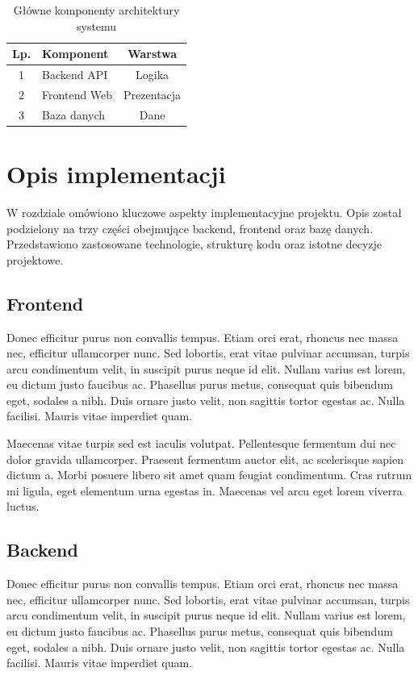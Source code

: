 \documentclass[times]{san}
\begin{document}
\begin{table}[h]
\centering
\caption{Główne komponenty architektury systemu}
\label{tab:lorem}
\begin{tabular}{|c|l|c|}
\hline
Lp. & Komponent          & Warstwa \\
\hline
1   & Backend API        & Logika   \\
2   & Frontend Web       & Prezentacja \\
3   & Baza danych        & Dane     \\
\hline
\end{tabular}
\end{table}

\section{Opis implementacji}

W rozdziale omówiono kluczowe aspekty implementacyjne projektu.
Opis został podzielony na trzy części obejmujące backend, frontend
oraz bazę danych. Przedstawiono zastosowane technologie, strukturę
kodu oraz istotne decyzje projektowe.

\subsection{Frontend}
Donec efficitur purus non convallis tempus. Etiam orci erat, rhoncus nec massa nec, efficitur ullamcorper nunc. Sed lobortis, erat vitae pulvinar accumsan, turpis arcu condimentum velit, in suscipit purus neque id elit. Nullam varius est lorem, eu dictum justo faucibus ac. Phasellus purus metus, consequat quis bibendum eget, sodales a nibh. Duis ornare justo velit, non sagittis tortor egestas ac. Nulla facilisi. Mauris vitae imperdiet quam. 

Maecenas vitae turpis sed est iaculis volutpat. Pellentesque fermentum dui nec dolor gravida ullamcorper. Praesent fermentum auctor elit, ac scelerisque sapien dictum a. Morbi posuere libero sit amet quam feugiat condimentum. Cras rutrum mi ligula, eget elementum urna egestas in. Maecenas vel arcu eget lorem viverra luctus.

\subsection{Backend}
Donec efficitur purus non convallis tempus. Etiam orci erat, rhoncus nec massa nec, efficitur ullamcorper nunc. Sed lobortis, erat vitae pulvinar accumsan, turpis arcu condimentum velit, in suscipit purus neque id elit. Nullam varius est lorem, eu dictum justo faucibus ac. Phasellus purus metus, consequat quis bibendum eget, sodales a nibh. Duis ornare justo velit, non sagittis tortor egestas ac. Nulla facilisi. Mauris vitae imperdiet quam. 
\end{document}
